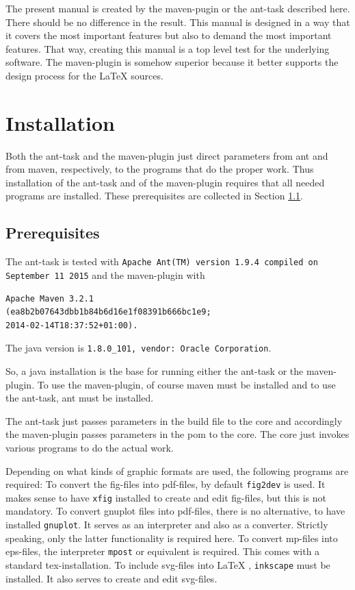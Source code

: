 \documentclass[12pt]{article}
\begin{document}
The present manual is created by the maven-pugin or the ant-task 
described here. 
There should be no difference in the result. 
This manual is designed in a way that it covers the most important features 
but also to demand the most important features. 
That way, creating this manual is a top level test 
for the underlying software. 
The maven-plugin is somehow superior 
because it better supports the design process for the \LaTeX{} sources. 



\section{Installation}

Both the ant-task and the maven-plugin just direct parameters 
from ant and from maven, respectively, 
to the programs that do the proper work. 
Thus installation of the ant-task and of the maven-plugin 
requires that all needed programs are installed. 
These prerequisites are collected in Section \ref{subsec:prerequisites}. 

\subsection{Prerequisites}\label{subsec:prerequisites}

The ant-task is tested with 
{\tt Apache Ant(TM) version 1.9.4 compiled on September 11 2015}
and the maven-plugin with 
%
\begin{verbatim}
Apache Maven 3.2.1
(ea8b2b07643dbb1b84b6d16e1f08391b666bc1e9; 
2014-02-14T18:37:52+01:00). 
\end{verbatim}
The java version is {\tt 1.8.0\_101, vendor: Oracle Corporation}. 

So, a java installation is the base for running either the ant-task 
or the maven-plugin. 
To use the maven-plugin, of course maven must be installed 
and to use the ant-task, ant must be installed. 

The ant-task just passes parameters in the build file to the core 
and accordingly the maven-plugin passes parameters in the pom 
to the core. 
The core just invokes various programs to do the actual work. 

Depending on what kinds of graphic formats are used, 
the following programs are required: 
To convert the \gls{fig}-files into \gls{pdf}-files, 
by default {\tt fig2dev} is used. 
It makes sense to have {\tt xfig} installed 
to create and edit fig-files, but this is not mandatory. 
To convert gnuplot files into pdf-files, there is no alternative, 
to have installed {\tt gnuplot}. 
It serves as an interpreter and also as a converter. 
Strictly speaking, only the latter functionality is required here. 
To convert \gls{mp}-files into \gls{eps}-files, 
the interpreter {\tt mpost} or equivalent is required. 
This comes with a standard tex-installation. 
To include \gls{svg}-files into \LaTeX{} , 
{\tt inkscape} must be installed. 
It also serves to create and edit svg-files. 
\end{document}
